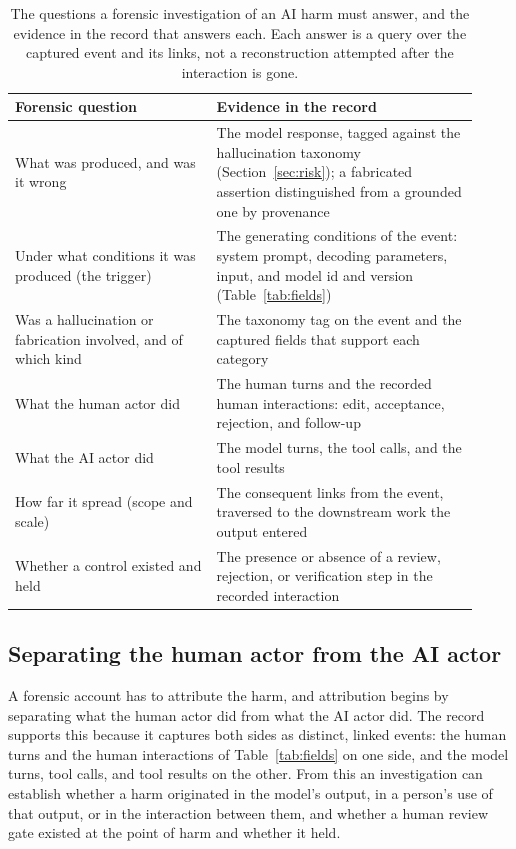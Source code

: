 \documentclass[11pt]{article}
\begin{document}
\begin{table}[t]
\centering
\small
\begin{tabular}{p{0.40\linewidth}p{0.52\linewidth}}
\toprule
Forensic question & Evidence in the record \\
\midrule
What was produced, and was it wrong & The model response, tagged against the hallucination taxonomy (Section~\ref{sec:risk}); a fabricated assertion distinguished from a grounded one by provenance \\
Under what conditions it was produced (the trigger) & The generating conditions of the event: system prompt, decoding parameters, input, and model id and version (Table~\ref{tab:fields}) \\
Was a hallucination or fabrication involved, and of which kind & The taxonomy tag on the event and the captured fields that support each category \\
What the human actor did & The human turns and the recorded human interactions: edit, acceptance, rejection, and follow-up \\
What the AI actor did & The model turns, the tool calls, and the tool results \\
How far it spread (scope and scale) & The consequent links from the event, traversed to the downstream work the output entered \\
Whether a control existed and held & The presence or absence of a review, rejection, or verification step in the recorded interaction \\
\bottomrule
\end{tabular}
\caption{The questions a forensic investigation of an AI harm must answer, and the
evidence in the record that answers each. Each answer is a query over the captured
event and its links, not a reconstruction attempted after the interaction is gone.}
\label{tab:forensics}
\end{table}

\subsection{Separating the human actor from the AI actor}

A forensic account has to attribute the harm, and attribution begins by separating
what the human actor did from what the AI actor did. The record supports this
because it captures both sides as distinct, linked events: the human turns and the
human interactions of Table~\ref{tab:fields} on one side, and the model turns, tool
calls, and tool results on the other. From this an investigation can establish
whether a harm originated in the model's output, in a person's use of that output,
or in the interaction between them, and whether a human review gate existed at the
point of harm and whether it held.
\end{document}
